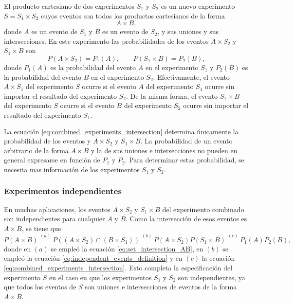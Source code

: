 \documentclass[a4paper]{report}
\begin{document}
El producto cartesiano de dos experimentos \(S_1\) y \(S_2\) es un nuevo experimento \(S=S_1\times S_2\) cuyos eventos son todos los productos cartesianos de la forma 
\[
 A\times B,
\]
donde \(A\) es un evento de \(S_1\) y \(B\) es un evento de \(S_2\), y sus uniones y sus intersecciones. En este experimento las probabilidades de los eventos \(A\times S_2\) y \(S_1\times B\) son
\begin{equation}\label{eq:combined_experiments_intersection}
 P(A\times S_2)=P_1(A),\qquad P(S_1\times B)=P_2(B),
\end{equation}
donde \(P_1(A)\) es la probabilidad del evento \(A\) en el experimento \(S_1\) y \(P_2(B)\) es la probabilidad del evento \(B\) en el experimento \(S_2\). Efectivamente, el evento \(A\times S_1\) del experimento \(S\) ocurre si el evento \(A\) del experimento \(S_1\) ocurre sin importar el resultado del experimento \(S_2\). De la misma forma, el evento \(S_1\times B\) del experimento \(S\) ocurre si el evento \(B\) del experimento \(S_2\) ocurre sin importar el resultado del experimento \(S_1\).

La ecuación \ref{eq:combined_experiments_intersection} determina únicamente la probabilidad de los eventos y \(A\times S_2\) y \(S_1\times B\). La probabilidad de un evento arbitrario de la forma \(A\times B\) y la de sus uniones e intersecciones no pueden en general expresarse en función de \(P_1\) y \(P_2\). Para determinar estas probabilidad, se necesita mas información de los experimentos \(S_1\) y \(S_2\).

\subsubsection{Experimentos independientes}

En muchas aplicaciones, los eventos \(A\times S_2\) y \(S_1\times B\) del experimento combinado son independientes para cualquier \(A\) y \(B\). Como la intersección de esos eventos es \(A\times B\), se tiene que
\[
 P(A\times B)\overset{(a)}{=}P((A\times S_2)\cap(B\times S_1))\overset{(b)}{=}P(A\times S_2)P(S_1\times B)\overset{(c)}{=}P_1(A)P_2(B),
\]
donde en \((a)\) se empleó la ecuación \ref{eq:set_intersection_AB}, en \((b)\) se empleó la ecuación \ref{eq:independent_events_definition} y en \((c)\) la ecuación \ref{eq:combined_experiments_intersection}. Esto completa la especificación del experimento \(S\) en el caso en que los experimentos \(S_1\) y \(S_2\) son independientes, ya que todos los eventos de \(S\) son uniones e intersecciones de eventos de la forma \(A\times B\).
\end{document}
